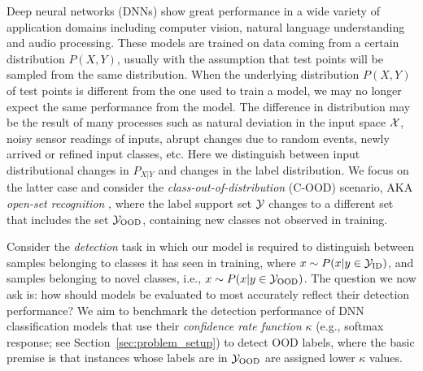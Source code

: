 \documentclass[table]{article} \usepackage{PRIMEarxiv}
\newcommand{\cY}{{\cal Y}}
\newcommand{\cX}{{\cal X}}
\begin{document}
Deep neural networks (DNNs) show great performance in a wide variety of application domains including computer vision, natural language understanding and audio processing.
These models are trained on data coming from a certain distribution $P(X,Y)$, usually with the assumption that test points will be sampled from the same distribution.
When the underlying distribution $P(X,Y)$ of test points is different from the one used to train a model, we may no longer expect the same performance from the model. 
The difference in distribution may be the result of many processes such as natural deviation in the input space $\cX$, noisy sensor readings of 
inputs, abrupt changes due to random events, newly arrived or refined input classes, etc. Here we distinguish between input 
distributional changes in $P_{X|Y}$ and changes in the label distribution.
We focus on the latter case and consider the 
\emph{class-out-of-distribution} (C-OOD) scenario, AKA \emph{open-set recognition} \citep{DBLP:journals/pami/ScheirerRSB13}, where the label support set
$\cY$ changes to a different set that includes the set $\cY_{\text{OOD}}$, containing new classes not observed in training.

Consider the \emph{detection} task in which our model is required to distinguish between samples belonging to classes it has seen in training, where $x\sim P(x|y\in \cY_{\text{ID}})$, and samples belonging to
novel classes, i.e., $x \sim  P(x|y\in \cY_{\text{\text{OOD}}})$. 
The question we now ask is: how
should models be evaluated to most accurately reflect their detection performance?
We aim to benchmark the detection performance of DNN classification models that use 
their \emph{confidence rate function} $\kappa$ (e.g., softmax response; see Section~\ref{sec:problem_setup}) to detect OOD labels, where the basic
premise is that instances whose labels are in $\cY_{\text{OOD}}$ are assigned 
lower $\kappa$ values.
\end{document}
